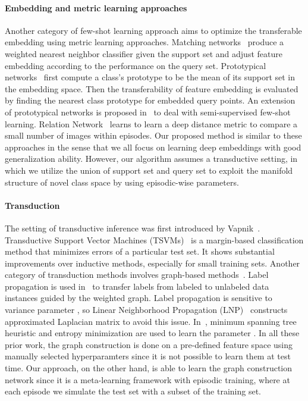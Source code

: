 \documentclass{article} \usepackage{iclr2019_conference,times}
\begin{document}
\paragraph{Embedding and metric learning approaches}
Another category of few-shot learning approach aims to optimize the transferable embedding using metric learning approaches. Matching networks~\citep{matching} produce a weighted nearest neighbor classifier given the support set and adjust feature embedding according to the performance on the query set. 
Prototypical networks~\citep{prototypical} first compute a class's prototype to be the mean of its support set in the embedding space. Then the transferability of feature embedding is evaluated by finding the nearest class prototype for embedded query points. An extension of prototypical networks is proposed in~\cite{semi-proto} to deal with semi-supervised few-shot learning.
Relation Network~\citep{compare} learns to learn a deep distance metric to compare a small number of images within episodes. Our proposed method is similar to these approaches in the sense that we all focus on learning deep embeddings with good generalization ability. However, our algorithm assumes a transductive setting, in which we utilize the union of support set and query set to exploit the manifold structure of novel class space by using episodic-wise parameters.

\paragraph{Transduction} 
The setting of transductive inference was first introduced by Vapnik~\citep{vapnik}. Transductive Support Vector Machines (TSVMs)~\citep{tsvm} is a margin-based classification method that minimizes errors of a particular test set. It shows substantial improvements over inductive methods, especially for small training sets. Another category of transduction methods involves graph-based methods~\citep{labelprop1,labelprop2,transfer,tzero}.  Label propagation is used in~\cite{labelprop1} to transfer labels from labeled to unlabeled data instances guided by the weighted graph. Label propagation is sensitive to variance parameter , so Linear Neighborhood Propagation (LNP)~\citep{labelprop2} constructs approximated Laplacian matrix to avoid this issue. In~\cite{labelprop3}, minimum spanning tree heuristic and entropy minimization are used to learn the parameter . In all these prior work, the graph construction is done on a pre-defined feature space using manually selected hyperparamters since it is not possible to learn them at test time. Our approach, on the other hand, is able to learn the graph construction network since it is a meta-learning framework with episodic training, where at each episode we simulate the test set with a subset of the training set.  
\end{document}
